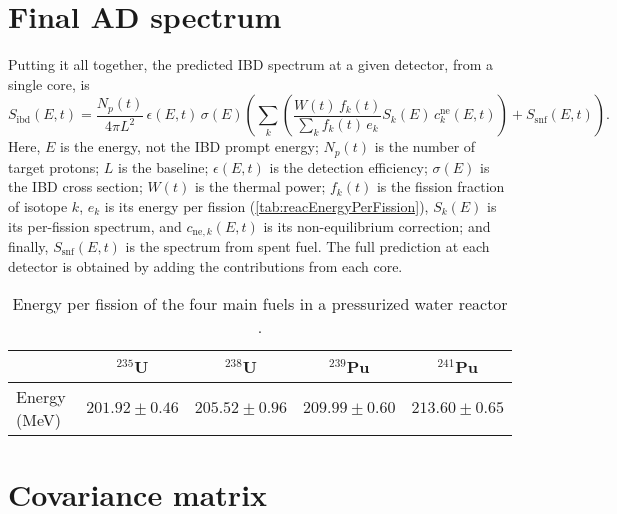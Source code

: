 \documentclass[../thesis.tex]{subfiles}
\begin{document}

\section{Final AD spectrum}
\label{sec:adspectra}

Putting it all together, the predicted IBD spectrum at a given detector, from a single core, is
\begin{equation}
  S_{\mathrm{ibd}}(E, t) = \frac{N_p(t)}{4\pi L^2} \, \epsilon(E, t) \,
    \sigma(E) \left( \sum_k \left( \frac{W(t) \, f_k(t)}{\sum_k f_k(t) \, e_k}
        S_k(E) \, c^{\mathrm{ne}}_k(E, t) \right) + S_{\mathrm{snf}}(E, t)
    \right).
\end{equation}
Here, $E$ is the \nubar energy, not the IBD prompt energy; $N_p(t)$ is the number of target protons; $L$ is the baseline; $\epsilon(E, t)$ is the detection efficiency; $\sigma(E)$ is the IBD cross section; $W(t)$ is the thermal power; $f_k(t)$ is the fission fraction of isotope $k$, $e_k$ is its energy per fission (\autoref{tab:reacEnergyPerFission}), $S_k(E)$ is its per-fission spectrum, and $c_{\mathrm{ne},k}(E, t)$ is its non-equilibrium correction; and finally, $S_\mathrm{snf}(E, t)$ is the spectrum from spent fuel. The full prediction at each detector is obtained by adding the contributions from each core.

\begin{table}[ht]
  \begin{tabular}{lcccc}
    \toprule
    & $^{235}$U & $^{238}$U & $^{239}$Pu & $^{241}$Pu \\
    \midrule
    Energy (MeV) & $201.92 \pm 0.46$ & $205.52 \pm 0.96$ & $209.99 \pm 0.60$ & $213.60 \pm 0.65$ \\
    \bottomrule
  \end{tabular}
  \caption{Energy per fission of the four main fuels in a pressurized water reactor \cite{Kopeikin_2004}.}
  \label{tab:reacEnergyPerFission}
\end{table}

\section{Covariance matrix}
\label{sec:reacunccorr}
\end{document}
